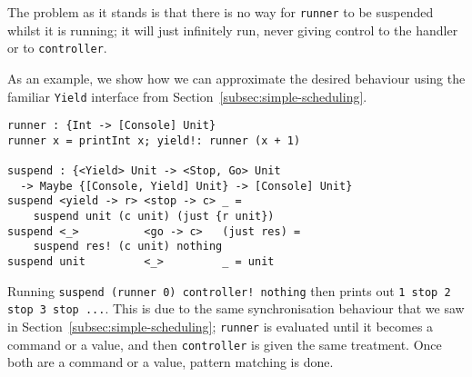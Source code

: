 \documentclass[msc,deptreport,cs]{infthesis} %
\newcommand{\code}[1]{\lstinline{#1}}
\begin{document}
The problem as it stands is that there is no way for \code{runner} to be
suspended whilst it is running; it will just infinitely run, never giving
control to the handler or to \code{controller}.


%




As an example, we show how we can approximate the desired behaviour using the familiar \code{Yield} interface from Section~\ref{subsec:simple-scheduling}.

\begin{lstlisting}
runner : {Int -> [Console] Unit}
runner x = printInt x; yield!: runner (x + 1)

suspend : {<Yield> Unit -> <Stop, Go> Unit
  -> Maybe {[Console, Yield] Unit} -> [Console] Unit}
suspend <yield -> r> <stop -> c> _ =
    suspend unit (c unit) (just {r unit})
suspend <_>          <go -> c>   (just res) =
    suspend res! (c unit) nothing
suspend unit         <_>         _ = unit
\end{lstlisting}

\noindent Running \code{suspend (runner 0) controller! nothing} then prints out
\code{1 stop 2 stop 3 stop ...}.
%
This is due to the same synchronisation behaviour that we saw in
Section~\ref{subsec:simple-scheduling}; \code{runner} is evaluated until it
becomes a command or a value, and then \code{controller} is given the same
treatment. Once both are a command or a value, pattern matching is done.
\end{document}
